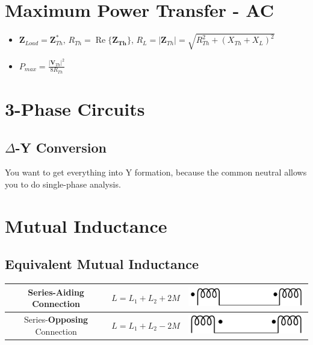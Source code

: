 \documentclass[10pt,letterpaper,final,twoside,notitlepage]{article}
\renewcommand{\Re}{\operatorname{Re}} %
\begin{document}
\section*{Maximum Power Transfer - AC}
			\begin{itemize}[noitemsep, nolistsep]
				\item $\mathbf{Z}_{Load}=\mathbf{Z}_{Th}^*$, $R_{Th}=\Re\lbrace\mathbf{Z_{Th}}\rbrace$, $R_L= \lvert \mathbf{Z}_{Th} \rvert = \sqrt{R_{Th}^2+\left( X_{Th}+X_{L}\right)^2}$
				\item $P_{max}=\frac{\lvert\mathbf{V}_{Th}\rvert^2}{8R_{Th}}$
			\end{itemize}

\section*{3-Phase Circuits} \label{sec:3-Phase}
	\subsection*{$\Delta$-Y Conversion} \label{subsec:Delta-Y Convert}
You want to get everything into Y formation, because the common neutral allows you to do single-phase analysis.

\section*{Mutual Inductance} \label{sec:Mutual Inductance}
	\subsection*{Equivalent Mutual Inductance}
		\begin{table}[h!] %
			\centering
			\renewcommand{\arraystretch}{2.75}
			\begin{tabular}{|c|c|c|}
			\hline
			Series-\textbf{Aiding} Connection & $L=L_{1}+L_{2}+2M$ & \includegraphics[scale=0.5]{Mutual_Inductors_Series_Dots_Aiding.png} \\ \hline
			Series-\textbf{Opposing} Connection & $L=L_{1}+L_{2}-2M$ & \includegraphics[scale=0.5]{Mutual_Inductors_Series_Dots_Opposing.png} \\ \hline
			\end{tabular}
		\end{table}
\end{document}

